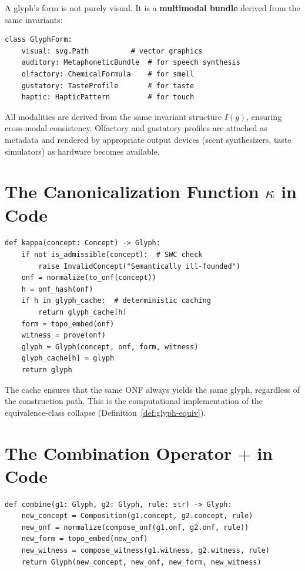 \documentclass[12pt, letterpaper]{book}
\def\oplus{+}%
\def\mathfrak#1{#1}%
\begin{document}
A glyph's form is not purely visual. It is a \textbf{multimodal bundle} derived from the same invariants:

\begin{lstlisting}
class GlyphForm:
    visual: svg.Path          # vector graphics
    auditory: MetaphoneticBundle  # for speech synthesis
    olfactory: ChemicalFormula    # for smell
    gustatory: TasteProfile       # for taste
    haptic: HapticPattern         # for touch
\end{lstlisting}

All modalities are derived from the same invariant structure $I(\mathfrak{g})$, ensuring cross-modal consistency. Olfactory and gustatory profiles are attached as metadata and rendered by appropriate output devices (scent synthesizers, taste simulators) as hardware becomes available.

\section{The Canonicalization Function $\kappa$ in Code}

\begin{lstlisting}
def kappa(concept: Concept) -> Glyph:
    if not is_admissible(concept):  # SWC check
        raise InvalidConcept("Semantically ill-founded")
    onf = normalize(to_onf(concept))
    h = onf_hash(onf)
    if h in glyph_cache:  # deterministic caching
        return glyph_cache[h]
    form = topo_embed(onf)
    witness = prove(onf)
    glyph = Glyph(concept, onf, form, witness)
    glyph_cache[h] = glyph
    return glyph
\end{lstlisting}

The cache ensures that the same ONF always yields the same glyph, regardless of the construction path. This is the computational implementation of the equivalence-class collapse (Definition~\ref{def:glyph-equiv}).

\section{The Combination Operator $\oplus$ in Code}

\begin{lstlisting}
def combine(g1: Glyph, g2: Glyph, rule: str) -> Glyph:
    new_concept = Composition(g1.concept, g2.concept, rule)
    new_onf = normalize(compose_onf(g1.onf, g2.onf, rule))
    new_form = topo_embed(new_onf)
    new_witness = compose_witness(g1.witness, g2.witness, rule)
    return Glyph(new_concept, new_onf, new_form, new_witness)
\end{lstlisting}
\end{document}
